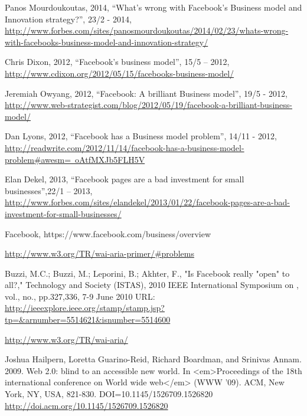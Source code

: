 \documentclass[conference]{IEEEtran}
\begin{document}
\begin{thebibliography}{1}
Panos Mourdoukoutas, 2014, “What's wrong with Facebook's Business model and
Innovation strategy?”, 23/2 - 2014,
\href{http://www.forbes.com/sites/panosmourdoukoutas/2014/02/23/whats-wrong-with-facebooks-business-model-and-innovation-strategy/}{http://www.forbes.com/sites/panosmourdoukoutas/2014/02/23/whats-wrong-with-facebooks-business-model-and-innovation-strategy/}

Chris Dixon, 2012, “Facebook's business model”, 15/5 – 2012,
\href{http://www.cdixon.org/2012/05/15/facebooks-business-model/}{http://www.cdixon.org/2012/05/15/facebooks-business-model/}

Jeremiah Owyang, 2012, “Facebook: A brilliant Business model”, 19/5 - 2012,
\href{http://www.web-strategist.com/blog/2012/05/19/facebook-a-brilliant-business-model/}{http://www.web-strategist.com/blog/2012/05/19/facebook-a-brilliant-business-model/}

Dan Lyons, 2012, “Facebook has a Business model problem”, 14/11 - 2012,
\href{http://readwrite.com/2012/11/14/facebook-has-a-business-model-problem\#awesm=~oAtfMXJb5FLH5V}{http://readwrite.com/2012/11/14/facebook-has-a-business-model-problem\#awesm=~oAtfMXJb5FLH5V}

Elan Dekel, 2013, “Facebook pages are a bad investment for small
businesses”,22/1 – 2013,
\href{http://www.forbes.com/sites/elandekel/2013/01/22/facebook-pages-are-a-bad-investment-for-small-businesses/}{http://www.forbes.com/sites/elandekel/2013/01/22/facebook-pages-are-a-bad-investment-for-small-businesses/}

Facebook, https://www.facebook.com/business/overview

    \href{http://www.w3.org/TR/wai-aria-primer/\#problems}{http://www.w3.org/TR/wai-aria-primer/\#problems }

Buzzi, M.C.; Buzzi, M.; Leporini, B.; Akhter, F., "Is Facebook really "open" to
all?," Technology and Society (ISTAS), 2010 IEEE International Symposium on ,
vol., no., pp.327,336, 7-9 June 2010
URL: \href{http://ieeexplore.ieee.org/stamp/stamp.jsp?tp=\&arnumber=5514621\&isnumber=5514600}{http://ieeexplore.ieee.org/stamp/stamp.jsp?tp=\&arnumber=5514621\&isnumber=5514600}

    \href{http://www.w3.org/TR/wai-aria/}{http://www.w3.org/TR/wai-aria/ }

Joshua Hailpern, Loretta Guarino-Reid, Richard Boardman, and Srinivas Annam.
2009. Web 2.0: blind to an accessible new world.  In <em>Proceedings of the
18th international conference on World wide web</em> (WWW '09). ACM, New York,
NY, USA,  821-830. DOI=10.1145/1526709.1526820
\href{http://doi.acm.org/10.1145/1526709.1526820}{http://doi.acm.org/10.1145/1526709.1526820}


\end{thebibliography}
\end{document}
